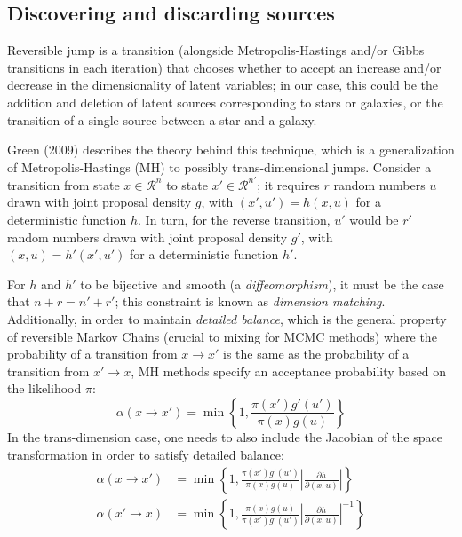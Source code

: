 \documentclass[11pt]{article}
\begin{document}
\subsection{Discovering and discarding sources}

Reversible jump is a transition (alongside Metropolis-Hastings and/or
Gibbs transitions in each iteration) that chooses whether to accept
an increase and/or decrease in the dimensionality of latent variables;
in our case, this could be the addition and deletion of latent sources
corresponding to stars or galaxies, or the transition of a single
source between a star and a galaxy.

Green (2009) describes the theory behind this technique, which is
a generalization of Metropolis-Hastings (MH) to possibly trans-dimensional
jumps. Consider a transition from state $x\in\mathcal{R}^{n}$ to
state $x'\in\mathcal{R}^{n'}$; it requires $r$ random numbers $u$
drawn with joint proposal density $g$, with $\left(x',u'\right)=h\left(x,u\right)$
for a deterministic function $h$. In turn, for the reverse transition,
$u'$ would be $r'$ random numbers drawn with joint proposal density
$g'$, with $\left(x,u\right)=h'\left(x',u'\right)$ for a deterministic
function $h'$.

For $h$ and $h'$ to be bijective and smooth (a \emph{diffeomorphism}),
it must be the case that $n+r=n'+r'$; this constraint is known as
\emph{dimension matching}. Additionally, in order to maintain \emph{detailed
balance}, which is the general property of reversible Markov Chains
(crucial to mixing for MCMC methods) where the probability of a transition
from $x\to x'$ is the same as the probability of a transition from
$x'\to x$, MH methods specify an acceptance probability based on
the likelihood $\pi$: 
\[
\alpha\left(x\to x'\right)=\min\left\{ 1,\frac{\pi\left(x'\right)g'\left(u'\right)}{\pi\left(x\right)g\left(u\right)}\right\} 
\]
In the trans-dimension case, one needs to also include the Jacobian
of the space transformation in order to satisfy detailed balance:
\begin{align*}
\alpha\left(x\to x'\right) & =\min\left\{ 1,\frac{\pi\left(x'\right)g'\left(u'\right)}{\pi\left(x\right)g\left(u\right)}\left|\frac{\partial h}{\partial\left(x,u\right)}\right|\right\} \\
\alpha\left(x'\to x\right) & =\min\left\{ 1,\frac{\pi\left(x\right)g\left(u\right)}{\pi\left(x'\right)g'\left(u'\right)}\left|\frac{\partial h}{\partial\left(x,u\right)}\right|^{-1}\right\} 
\end{align*}
\end{document}
